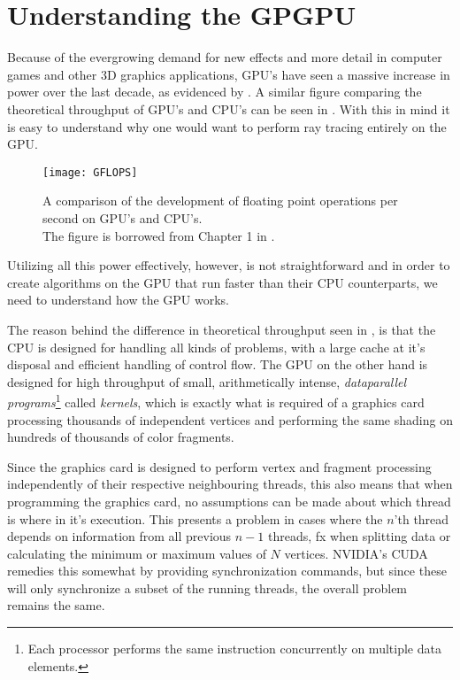 \chapter{Understanding the GPGPU}\label{chp:GPGPU}





Because of the evergrowing demand for new effects and more detail in
computer games and other 3D graphics applications, GPU's have seen a
massive increase in power over the last decade, as evidenced by
. A similar figure comparing the theoretical
throughput of GPU's and CPU's can be seen in . With
this in mind it is easy to understand why one would want to perform
ray tracing entirely on the GPU.

\begin{figure}
  \centering
  \texttt{[image: GFLOPS]}
  \caption{A comparison of the development of floating point
    operations per second on GPU's and CPU's. \\The figure is borrowed
    from Chapter 1 in .}
  \label{fig:gflops}
\end{figure}


Utilizing all this power effectively, however, is not straightforward
and in order to create algorithms on the GPU that run faster than their
CPU counterparts, we need to understand how the GPU works.

The reason behind the difference in theoretical throughput seen in
, is that the CPU is designed for handling all
kinds of problems, with a large cache at it's disposal and efficient
handling of control flow. The GPU on the other hand is designed for
high throughput of small, arithmetically intense, \textit{dataparallel
  programs}\footnote{Each processor performs the same instruction
  concurrently on multiple data elements.} called \textit{kernels},
which is exactly what is required of a graphics card processing
thousands of independent vertices and performing the same shading on
hundreds of thousands of color fragments.

Since the graphics card is designed to perform vertex and fragment
processing independently of their respective neighbouring threads,
this also means that when programming the graphics card, no
assumptions can be made about which thread is where in it's
execution. This presents a problem in cases where the $n$'th thread
depends on information from all previous $n-1$ threads, fx when
splitting data or calculating the minimum or maximum values of $N$
vertices. NVIDIA's CUDA remedies this somewhat by providing
synchronization commands, but since these will only synchronize a
subset of the running threads, the overall problem remains the same.

